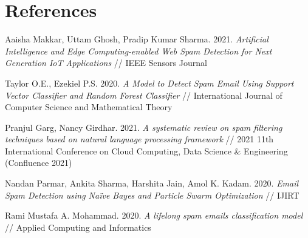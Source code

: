 \documentclass[12pt]{jpconf}
\begin{document}
\section*{References}
\begin{thebibliography}{99}
Aaisha Makkar, Uttam Ghosh, Pradip Kumar Sharma.
2021. \emph{Artificial Intelligence and Edge Computing-enabled
	Web Spam Detection for Next Generation IoT
	Applications} // IEEE Sensors Journal

Taylor O.E., Ezekiel P.S.
2020. \emph{A Model to Detect Spam Email Using Support Vector Classifier and Random Forest Classifier} //
International Journal of Computer Science and Mathematical Theory

Pranjul Garg, Nancy Girdhar.
2021. \emph{A systematic review on spam filtering techniques based on
natural language processing framework} // 2021 11th International Conference on Cloud Computing, Data Science \& Engineering (Confluence 2021)

Nandan Parmar, Ankita Sharma, Harshita Jain, Amol K. Kadam.
2020. \emph{Email Spam Detection using Naïve Bayes and Particle Swarm Optimization} // IJIRT

Rami Mustafa A. Mohammad.
2020. \emph{A lifelong spam emails 	classification model} //
Applied Computing and Informatics
\end{thebibliography}
\end{document}
